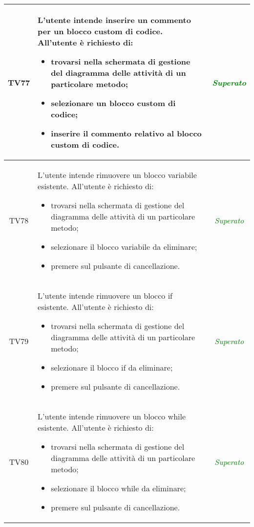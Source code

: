 \begin{longtable}{|c|>{}m{8cm}|c|}
\hypertarget{TV4.6.2}{TV77} & L'utente intende inserire un commento per un blocco custom di codice.
All'utente è richiesto di:
\begin{itemize}
	\item trovarsi nella schermata di gestione del diagramma delle attività di un particolare metodo;
	\item selezionare un blocco custom di codice;
	\item inserire il commento relativo al blocco custom di codice.
\end{itemize} & \textcolor{Green}{\textit{Superato}}\\ \hline

\hypertarget{TV4.7}{TV78} & L'utente intende rimuovere un blocco variabile esistente.
All'utente è richiesto di:
\begin{itemize}
	\item trovarsi nella schermata di gestione del diagramma delle attività di un particolare metodo;
	\item selezionare il blocco variabile da eliminare;
	\item premere sul pulsante di cancellazione.
\end{itemize} & \textcolor{Green}{\textit{Superato}}\\ \hline

\hypertarget{TV4.9}{TV79} & L'utente intende rimuovere un blocco if esistente.
All'utente è richiesto di:
\begin{itemize}
	\item trovarsi nella schermata di gestione del diagramma delle attività di un particolare metodo;
	\item selezionare il blocco if da eliminare;
	\item premere sul pulsante di cancellazione.
\end{itemize} & \textcolor{Green}{\textit{Superato}}\\ \hline

\hypertarget{TV4.10}{TV80} & L'utente intende rimuovere un blocco while esistente.
All'utente è richiesto di:
\begin{itemize}
	\item trovarsi nella schermata di gestione del diagramma delle attività di un particolare metodo;
	\item selezionare il blocco while da eliminare;
	\item premere sul pulsante di cancellazione.
\end{itemize} & \textcolor{Green}{\textit{Superato}}\\ \hline


\end{longtable}

